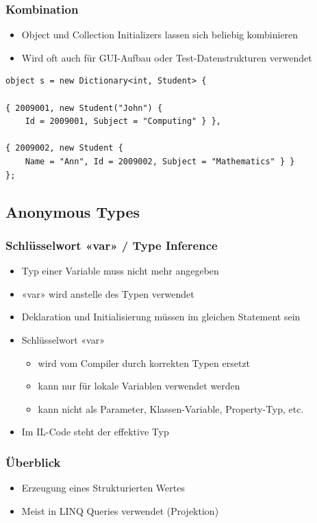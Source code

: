 \subsubsection{Kombination}
\begin{itemize}
    \item Object und Collection Initializers lassen sich beliebig kombinieren
    \item Wird oft auch für GUI-Aufbau oder Test-Datenstrukturen verwendet
\end{itemize}
\begin{lstlisting}
object s = new Dictionary<int, Student> {

{ 2009001, new Student("John") {
    Id = 2009001, Subject = "Computing" } },

{ 2009002, new Student {
    Name = "Ann", Id = 2009002, Subject = "Mathematics" } }
};
\end{lstlisting}


\subsection{Anonymous Types}

\subsubsection{Schlüsselwort «var» / Type Inference}
\begin{itemize}
    \item Typ einer Variable muss nicht mehr angegeben
    \item «var» wird anstelle des Typen verwendet
    \item Deklaration und Initialisierung müssen im gleichen Statement sein
    \item Schlüsselwort «var»
    \begin{itemize}
        \item wird vom Compiler durch korrekten Typen ersetzt
        \item kann nur für lokale Variablen verwendet werden
        \item kann nicht als Parameter, Klassen-Variable, Property-Typ, etc.
    \end{itemize}
    \item Im IL-Code steht der effektive Typ
\end{itemize}

\subsubsection{Überblick}
\begin{itemize}
    \item Erzeugung eines Strukturierten Wertes
    \item Meist in LINQ Queries verwendet (Projektion)
\end{itemize}

